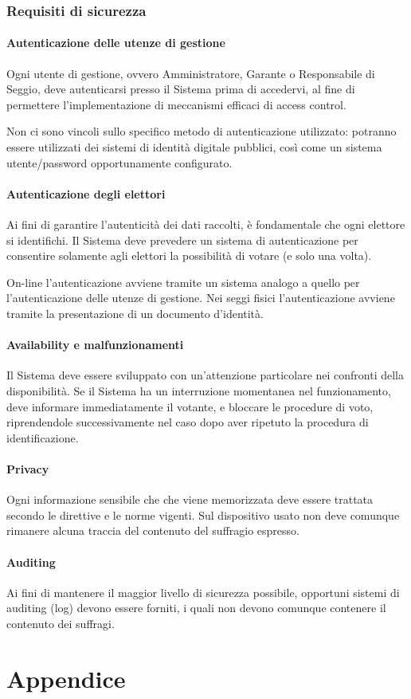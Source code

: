 \documentclass{report}
\begin{document}
\subsection{Requisiti di sicurezza}

\subsubsection{Autenticazione delle utenze di gestione}
Ogni utente di gestione, ovvero Amministratore, Garante o Responsabile di Seggio, deve autenticarsi presso il Sistema prima di accedervi, al fine di permettere l'implementazione di meccanismi efficaci di access control. 

Non ci sono vincoli sullo specifico metodo di autenticazione utilizzato: potranno essere utilizzati dei sistemi di identità digitale pubblici, così come un sistema utente/password opportunamente configurato.

\subsubsection{Autenticazione degli elettori}
Ai fini di garantire l'autenticità dei dati raccolti, è fondamentale che ogni elettore si identifichi. Il Sistema deve prevedere un sistema di autenticazione per consentire solamente agli elettori la possibilità di votare (e solo una volta).

On-line l'autenticazione avviene tramite un sistema analogo a quello per l'autenticazione delle utenze di gestione. Nei seggi fisici l'autenticazione avviene tramite la presentazione di un documento d'identità.

\subsubsection{Availability e malfunzionamenti}
Il Sistema deve essere sviluppato con un'attenzione particolare nei confronti della disponibilità. Se il Sistema ha un interruzione momentanea nel funzionamento, deve informare immediatamente il votante, e bloccare le procedure di voto, riprendendole successivamente nel caso dopo aver ripetuto la procedura di identificazione.

\subsubsection{Privacy}
Ogni informazione sensibile che che viene memorizzata deve essere trattata secondo le direttive e le norme vigenti. Sul dispositivo usato non deve comunque rimanere alcuna traccia del contenuto del suffragio espresso.

\subsubsection{Auditing}
Ai fini di mantenere il maggior livello di sicurezza possibile, opportuni sistemi di auditing (log) devono essere forniti, i quali non devono comunque contenere il contenuto dei suffragi.






\chapter{Appendice}


\end{document}
